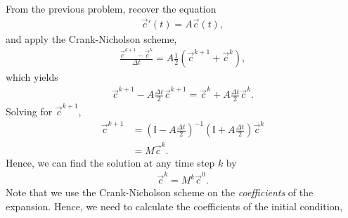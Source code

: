 \begin{questions}
\begin{solution}
From the previous problem, recover the equation
\begin{align*}
\overrightarrow{c}' (t) = A\overrightarrow{c}(t),
\end{align*}
and apply the Crank-Nicholson scheme,
\begin{align*}
\frac{\overrightarrow{c}^{k+1}-\overrightarrow{c}^{k}}{\Delta t} = A\frac{1}{2}\left(\overrightarrow{c}^{k+1}+\overrightarrow{c}^{k}\right),
\end{align*}
which yields
\begin{align*}
\overrightarrow{c}^{k+1} - A\frac{\Delta t}{2} \overrightarrow{c}^{k+1} = \overrightarrow{c}^{k} + A\frac{\Delta t}{2} \overrightarrow{c}^{k}.
\end{align*}
Solving for $\overrightarrow{c}^{k+1}$,
\begin{align*}
\overrightarrow{c}^{k+1}&= \left(\mathbb{I} - A\frac{\Delta t}{2}\right)^{-1}\left(\mathbb{I} + A\frac{\Delta t}{2}\right) \overrightarrow{c}^{k}\\
&= M \overrightarrow{c}^{k}.
\end{align*}
Hence, we can find the solution at any time step $k$ by 
\begin{align*}
\overrightarrow{c}^{k} = M^k \overrightarrow{c}^{0}.
\end{align*}
Note that we use the Crank-Nicholson scheme on the \textit{coefficients} of the expansion. Hence, we need to calculate the coefficients of the initial condition,

\end{solution}
\end{questions}
